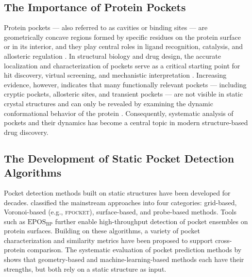 \documentclass[11pt,a4paper]{article}
\begin{document}
\subsection{The Importance of Protein Pockets}
Protein pockets --- also referred to as cavities or binding sites ---
are geometrically concave regions formed by specific residues on the
protein surface or in its interior, and they play central roles in
ligand recognition, catalysis, and allosteric regulation
\citep{stank2016protein,krone2016visual}. In structural biology and
drug design, the accurate localization and characterization of pockets
serve as a critical starting point for hit discovery, virtual
screening, and mechanistic interpretation
\citep{meller2025cryptic,krivak2024comparative}. Increasing evidence,
however, indicates that many functionally relevant pockets ---
including cryptic pockets, allosteric sites, and transient pockets
--- are not visible in static crystal structures and can only be
revealed by examining the dynamic conformational behavior of the
protein \citep{stank2016protein,meller2025cryptic}. Consequently,
systematic analysis of pockets and their dynamics has become a central
topic in modern structure-based drug discovery.

\subsection{The Development of Static Pocket Detection Algorithms}
Pocket detection methods built on static structures have been
developed for decades. \citet{krone2016visual} classified the
mainstream approaches into four categories: grid-based,
Voronoi-based (e.g., \textsc{fpocket}), surface-based, and
probe-based methods. Tools such as $\text{EPOS}_{\text{BP}}$
\citep{eposbp_website} further enable high-throughput detection of
pocket ensembles on protein surfaces. Building on these algorithms,
a variety of pocket characterization and similarity metrics have been
proposed \citep{eguida2022estimating,weill2010alignment} to support
cross-protein comparison. The systematic evaluation of pocket
prediction methods by \citet{krivak2024comparative} shows that
geometry-based and machine-learning-based methods each have their
strengths, but both rely on a static structure as input.
\end{document}
